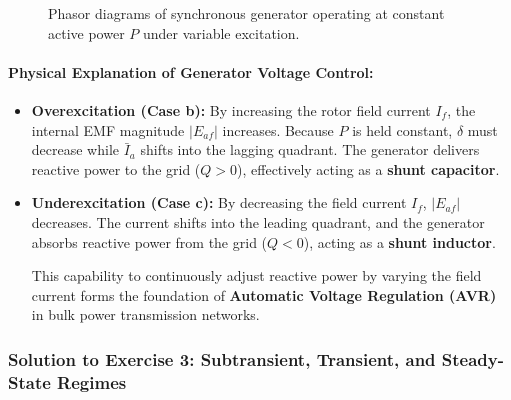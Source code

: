 \begin{figure}[htbp]
{
    }
    \caption{Phasor diagrams of synchronous generator operating at constant active power $P$ under variable excitation.}
    \label{fig:tp5_phasors}
\end{figure}

\paragraph{Physical Explanation of Generator Voltage Control:}
\begin{itemize}
    \item \textbf{Overexcitation (Case b):}
    By increasing the rotor field current $I_f$, the internal EMF magnitude $|E_{af}|$ increases. Because $P$ is held constant, $\delta$ must decrease while $\bar{I}_a$ shifts into the lagging quadrant. The generator delivers reactive power to the grid ($Q > 0$), effectively acting as a \textbf{shunt capacitor}.
    
    \item \textbf{Underexcitation (Case c):}
    By decreasing the field current $I_f$, $|E_{af}|$ decreases. The current shifts into the leading quadrant, and the generator absorbs reactive power from the grid ($Q < 0$), acting as a \textbf{shunt inductor}.
    
    This capability to continuously adjust reactive power by varying the field current forms the foundation of \textbf{Automatic Voltage Regulation (AVR)} in bulk power transmission networks.
\end{itemize}

\subsubsection*{Solution to Exercise 3: Subtransient, Transient, and Steady-State Regimes}
